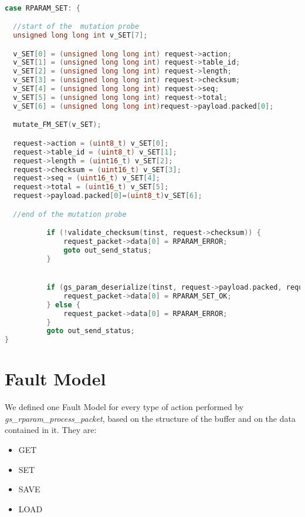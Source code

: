 \begin{lstlisting}[language=C++, caption=Probe insertion Strategy, label={lst:probe_insertion}]

case RPARAM_SET: {

  //start of the  mutation probe
  unsigned long long int v_SET[7];

  v_SET[0] = (unsigned long long int) request->action;
  v_SET[1] = (unsigned long long int) request->table_id;
  v_SET[2] = (unsigned long long int) request->length;
  v_SET[3] = (unsigned long long int) request->checksum;
  v_SET[4] = (unsigned long long int) request->seq;
  v_SET[5] = (unsigned long long int) request->total;
  v_SET[6] = (unsigned long long int)request->payload.packed[0];

  mutate_FM_SET(v_SET);

  request->action = (uint8_t) v_SET[0];
  request->table_id = (uint8_t) v_SET[1];
  request->length = (uint16_t) v_SET[2];
  request->checksum = (uint16_t) v_SET[3];
  request->seq = (uint16_t) v_SET[4];
  request->total = (uint16_t) v_SET[5];
  request->payload.packed[0]=(uint8_t)v_SET[6];

  //end of the mutation probe

          if (!validate_checksum(tinst, request->checksum)) {
              request_packet->data[0] = RPARAM_ERROR;
              goto out_send_status;
          }


          if (gs_param_deserialize(tinst, request->payload.packed, request->length, F_FROM_BIG_ENDIAN) == GS_OK) {
              request_packet->data[0] = RPARAM_SET_OK;
          } else {
              request_packet->data[0] = RPARAM_ERROR;
          }
          goto out_send_status;
}

\end{lstlisting}

\section{Fault Model}

We defined one Fault Model for every type of action performed by \emph{gs\_rparam\_process\_packet}, based on the structure of the buffer and on the data contained in it.
They are:
\begin{itemize}
\item GET
\item SET
\item SAVE
\item LOAD
\end{itemize}

